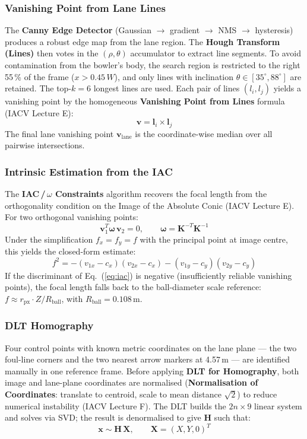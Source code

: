 \documentclass[11pt,twoside]{article}
\begin{document}
\subsubsection*{Vanishing Point from Lane Lines}
The \textbf{Canny Edge Detector} (Gaussian $\to$ gradient $\to$ NMS $\to$ hysteresis) produces a robust edge map from the lane region.
The \textbf{Hough Transform (Lines)} then votes in the $(\rho, \theta)$ accumulator to extract line segments.
To avoid contamination from the bowler's body, the search region is restricted to the right 55\,\% of the frame ($x > 0.45\,W$), and only lines with inclination $\theta \in [35^\circ, 88^\circ]$ are retained.
The top-$k = 6$ longest lines are used.
Each pair of lines $(l_i, l_j)$ yields a vanishing point by the homogeneous \textbf{Vanishing Point from Lines} formula (IACV Lecture E):
\begin{equation}
    \mathbf{v} = \mathbf{l}_i \times \mathbf{l}_j
\end{equation}
The final lane vanishing point $\mathbf{v}_{\text{lane}}$ is the coordinate-wise median over all pairwise intersections.

\subsubsection*{Intrinsic Estimation from the IAC}
The \textbf{IAC\,/\,$\omega$ Constraints} algorithm recovers the focal length from the orthogonality condition on the Image of the Absolute Conic (IACV Lecture E).
For two orthogonal vanishing points:
\begin{equation}
    \mathbf{v}_1^T \bm{\omega}\, \mathbf{v}_2 = 0, \qquad \bm{\omega} = \mathbf{K}^{-T}\mathbf{K}^{-1}
\end{equation}
Under the simplification $f_x = f_y = f$ with the principal point at image centre, this yields the closed-form estimate:
\begin{equation}
    f^2 = -(v_{1x} - c_x)(v_{2x} - c_x) - (v_{1y} - c_y)(v_{2y} - c_y)
    \label{eq:iac}
\end{equation}
If the discriminant of Eq.~(\ref{eq:iac}) is negative (insufficiently reliable vanishing points), the focal length falls back to the ball-diameter scale reference: $f \approx r_{\text{px}} \cdot Z / R_{\text{ball}}$, with $R_{\text{ball}} = 0.108$\,m.

\subsubsection*{DLT Homography}
Four control points with known metric coordinates on the lane plane --- the two foul-line corners and the two nearest arrow markers at 4.57\,m --- are identified manually in one reference frame.
Before applying \textbf{DLT for Homography}, both image and lane-plane coordinates are normalised (\textbf{Normalisation of Coordinates}: translate to centroid, scale to mean distance $\sqrt{2}$) to reduce numerical instability (IACV Lecture F).
The DLT builds the $2n \times 9$ linear system and solves via SVD; the result is denormalised to give $\mathbf{H}$ such that:
\begin{equation}
    \mathbf{x} \sim \mathbf{H}\,\mathbf{X}, \qquad \mathbf{X} = (X, Y, 0)^T
\end{equation}
\end{document}
